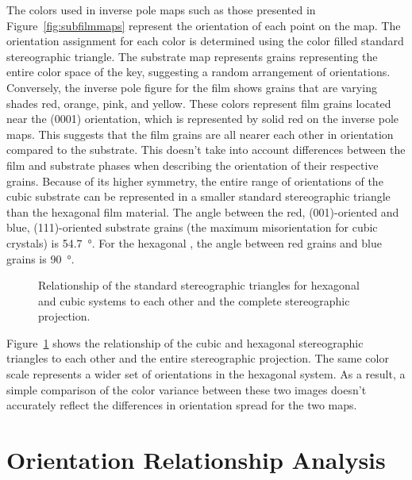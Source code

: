 \documentclass[12pt,%
              twoside,
               letterpaper]{uiothesis}
\begin{document}
The colors used in inverse pole maps such as those presented in Figure~\ref{fig:subfilmmaps}
represent the orientation of each point on the map. The orientation assignment for each
color is determined using the color filled standard stereographic triangle. The substrate
map represents grains representing the entire color space of the key, suggesting a random
arrangement of orientations. Conversely, the inverse pole figure for the film shows grains
that are varying shades red, orange, pink, and yellow. These colors represent film grains
located near the (0001) orientation, which is represented by solid red on the inverse pole
maps. This suggests that the film grains are all nearer each other in orientation compared
to the substrate. This doesn't take into account differences between the film and
substrate phases when describing the orientation of their respective grains. Because of
its higher symmetry, the entire range of orientations of the cubic substrate can be
represented in a smaller standard stereographic triangle than the hexagonal film material.
The angle between the red, (001)-oriented and blue, (111)-oriented substrate grains (the
maximum misorientation for cubic crystals) is \SI{54.7}{\degree}. For the hexagonal \feo,
the angle between red grains and blue grains is \SI{90}{\degree}. 
\begin{figure}
	\begin{center}
		\caption[Relationship of stereographic triangles]{%
			Relationship of the standard stereographic triangles for hexagonal
			and cubic systems to each other and the complete stereographic 
			projection.}
	\label{fig:stereotriangles}
	\end{center}
\end{figure}
Figure~\ref{fig:stereotriangles} shows the relationship of the cubic and hexagonal
stereographic triangles to each other and the entire stereographic projection. The same
color scale represents a wider set of orientations in the hexagonal system. As a result, a
simple comparison of the color variance between these two images doesn't accurately
reflect the differences in orientation spread for the two maps.


\section{Orientation Relationship Analysis}
\label{sec:poly.growth.orients}
\end{document}
